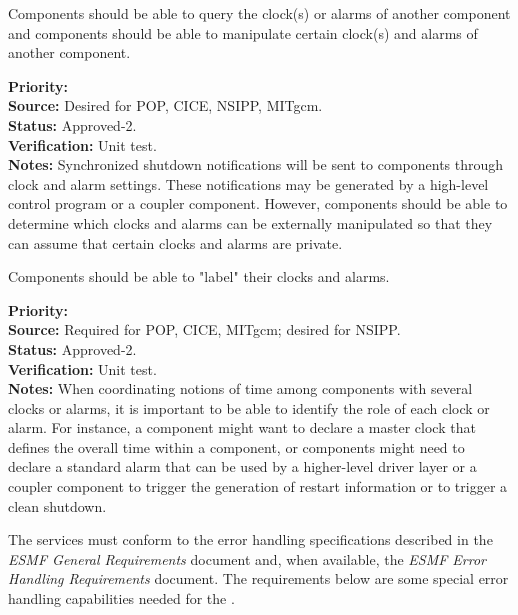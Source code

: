 Components should be able to query the clock(s) or alarms of another
component and components should be able to manipulate certain clock(s) 
and alarms of another component.
\begin{reqlist}
{\bf Priority:} \\
{\bf Source:} Desired for POP, CICE, NSIPP, MITgcm. \\
{\bf Status:} Approved-2. \\
{\bf Verification:} Unit test. \\
{\bf Notes:}
Synchronized shutdown notifications will be sent to components through clock
and alarm settings. These notifications may be generated by a high-level control program
or a coupler component. However, components should be able to determine 
which clocks and alarms can be externally manipulated so that they can assume that
certain clocks and alarms are private.
\end{reqlist}

Components should be able to "label" their clocks and alarms.
\begin{reqlist}
{\bf Priority:} \\
{\bf Source:} Required for POP, CICE, MITgcm; desired for NSIPP. \\
{\bf Status:} Approved-2. \\
{\bf Verification:} Unit test. \\
{\bf Notes:}
When coordinating notions of time among components with several
clocks or alarms, it is important to be able to identify the role of 
each clock or alarm.
For instance, a component might want to declare a master clock that 
defines the overall time within a component, or components
might need to declare a standard alarm that can be used
by a higher-level driver layer or a coupler component to trigger 
the generation of restart information or to trigger a clean shutdown.
\end{reqlist}


\label{req:errors}

The \funcname services must conform to the error handling specifications described 
in the {\it ESMF General Requirements} document \cite{ESMFGenReq} and, when available, 
the {\it ESMF Error Handling Requirements} document.  The requirements below are some
special error handling capabilities needed for the \funcname.


